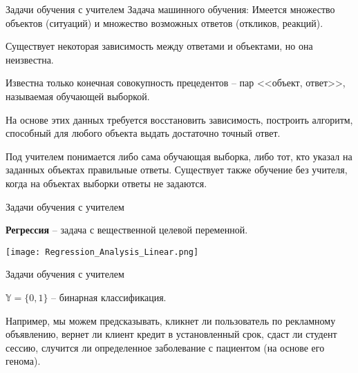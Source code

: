 \documentclass[pdf, intlimits, 9pt, unicode]{beamer}
\begin{document}

\begin{frame}{Задачи обучения с учителем}
Задача машинного обучения: Имеется множество объектов (ситуаций) и множество возможных ответов (откликов, реакций).\pause

Существует некоторая зависимость между ответами и объектами, но она неизвестна.\pause

Известна только конечная совокупность прецедентов -- пар <<объект, ответ>>, называемая обучающей выборкой.\pause

На основе этих данных требуется восстановить зависимость, построить алгоритм, способный {\color{red}для любого объекта выдать достаточно точный ответ}.\pause


Под учителем понимается либо сама обучающая выборка, либо тот, кто указал на заданных объектах правильные ответы. Существует также обучение без учителя, когда на объектах выборки ответы не задаются.
\end{frame}









\begin{frame}{Задачи обучения с учителем}

\textbf{Регрессия} -- задача с вещественной целевой переменной.\bigskip

\begin{center}\texttt{[image: Regression\_Analysis\_Linear.png]}\end{center}
\end{frame}






\begin{frame}{Задачи обучения с учителем}

$\mathbb{Y} = \{0,1\}$ -- бинарная классификация.
\bigskip

Например, мы можем предсказывать, кликнет ли пользователь по рекламному объявлению, вернет ли клиент кредит в установленный срок, сдаст ли студент сессию, случится ли определенное заболевание с пациентом (на основе его генома).

\end{frame}
\end{document}
